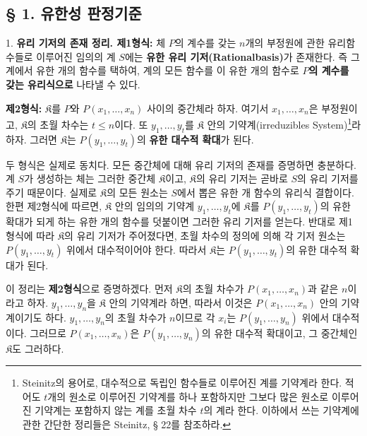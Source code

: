 \documentclass[11pt]{article}
\begin{document}
\subsection*{§ 1. 유한성 판정기준}

1. \textbf{유리 기저의 존재 정리. 제1형식:} 체 $P$의 계수를 갖는 $n$개의 부정원에 관한 유리함수들로 이루어진 임의의 계 $S$에는 \textbf{유한 유리 기저(Rationalbasis)}가 존재한다. 즉 그 계에서 유한 개의 함수를 택하여, 계의 모든 함수를 이 유한 개의 함수로 \textbf{$P$의 계수를 갖는 유리식으로} 나타낼 수 있다.

\textbf{제2형식:} $\mathfrak K$를 $P$와 $P(x_1,\ldots,x_n)$ 사이의 중간체라 하자. 여기서 $x_1,\ldots,x_n$은 부정원이고, $\mathfrak K$의 초월 차수는 $t\leq n$이다. 또 $y_1,\ldots,y_t$를 $\mathfrak K$ 안의 기약계(irreduzibles System)\footnote{Steinitz의 용어로, 대수적으로 독립인 함수들로 이루어진 계를 기약계라 한다. 적어도 $t$개의 원소로 이루어진 기약계를 하나 포함하지만 그보다 많은 원소로 이루어진 기약계는 포함하지 않는 계를 초월 차수 $t$의 계라 한다. 이하에서 쓰는 기약계에 관한 간단한 정리들은 Steinitz, § 22를 참조하라.}라 하자. 그러면 $\mathfrak K$는 $P(y_1,\ldots,y_t)$의 \textbf{유한 대수적 확대}가 된다.

두 형식은 실제로 동치다. 모든 중간체에 대해 유리 기저의 존재를 증명하면 충분하다. 계 $S$가 생성하는 체는 그러한 중간체 $\mathfrak K$이고, $\mathfrak K$의 유리 기저는 곧바로 $S$의 유리 기저를 주기 때문이다. 실제로 $\mathfrak K$의 모든 원소는 $S$에서 뽑은 유한 개 함수의 유리식 결합이다. 한편 제2형식에 따르면, $\mathfrak K$ 안의 임의의 기약계 $y_1,\ldots,y_t$에 $\mathfrak K$를 $P(y_1,\ldots,y_t)$의 유한 확대가 되게 하는 유한 개의 함수를 덧붙이면 그러한 유리 기저를 얻는다. 반대로 제1형식에 따라 $\mathfrak K$의 유리 기저가 주어졌다면, 초월 차수의 정의에 의해 각 기저 원소는 $P(y_1,\ldots,y_t)$ 위에서 대수적이어야 한다. 따라서 $\mathfrak K$는 $P(y_1,\ldots,y_t)$의 유한 대수적 확대가 된다.

이 정리는 \textbf{제2형식}으로 증명하겠다. 먼저 $\mathfrak K$의 초월 차수가 $P(x_1,\ldots,x_n)$과 같은 $n$이라고 하자. $y_1,\ldots,y_n$을 $\mathfrak K$ 안의 기약계라 하면, 따라서 이것은 $P(x_1,\ldots,x_n)$ 안의 기약계이기도 하다. $y_1,\ldots,y_n$의 초월 차수가 $n$이므로 각 $x_i$는 $P(y_1,\ldots,y_n)$ 위에서 대수적이다. 그러므로 $P(x_1,\ldots,x_n)$은 $P(y_1,\ldots,y_n)$의 유한 대수적 확대이고, 그 중간체인 $\mathfrak K$도 그러하다.
\end{document}
